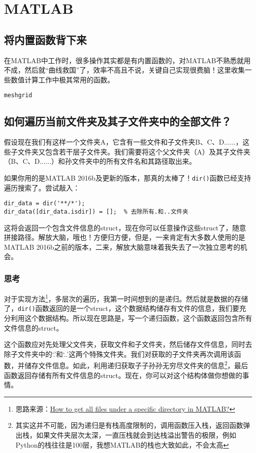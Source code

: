 \chapter{MATLAB}

\section{将内置函数背下来}

在MATLAB中工作时，很多操作其实都是有内置函数的，对MATLAB不熟悉就用不成，然后就“曲线救国”了，效率不高且不说，关键自己实现很费脑！这里收集一些数值计算工作中极其常用的函数。

\texttt{meshgrid}

\section{如何遍历当前文件夹及其子文件夹中的全部文件？}

假设现在我们有这样一个文件夹A，它含有一些文件和子文件夹B、C、D......，这些子文件夹又包含若干层子文件夹。我们需要将这个父文件夹（A）及其子文件夹（B、C、D......）和孙文件夹中的所有文件名和其路径取出来。

如果你用的是MATLAB 2016b及更新的版本，那真的太棒了！\texttt{dir()}函数已经支持遍历搜索了。尝试敲入：

\begin{verbatim}
dir_data = dir('**/*');
dir_data([dir_data.isdir]) = [];  % 去除所有.和..文件夹
\end{verbatim}

这将会返回一个包含文件信息的struct，现在你可以任意操作这些struct了，随意拼接路径。解放大脑，哦也！方便归方便，但是，一来肯定有大多数人使用的是MATLAB 2016b之前的版本，二来，解放大脑意味着我失去了一次独立思考的机会。

\subsection*{思考}

对于实现方法\footnote{思路来源：\href{https://stackoverflow.com/questions/2652630/how-to-get-all-files-under-a-specific-directory-in-matlab}{How to get all files under a specific directory in MATLAB?}}，多层次的遍历，我第一时间想到的是递归。然后就是数据的存储了，\texttt{dir()}函数返回的是一个struct，这个数据结构储存有文件的信息，我们要充分利用这个数据结构。所以现在思路是，写一个递归函数，这个函数返回包含所有文件信息的struct。

这个函数应对先处理父文件夹，获取文件和子文件夹，然后储存文件信息，同时去除子文件夹中的`.'和`..'这两个特殊文件夹。我们对获取的子文件夹再次调用该函数，并储存文件信息。如此，利用递归获取子子孙孙无穷尽文件夹的信息\footnote{其实这并不可能，因为递归是有栈高度限制的，调用函数压入栈，返回函数弹出栈，如果文件夹层次太深，一直压栈就会到达栈溢出警告的极限，例如Python的栈往往是100层，我想MATLAB的栈也大致如此，不会太高}，最后函数返回存储有所有文件信息的struct。现在，你可以对这个结构体做你想做的事情。

